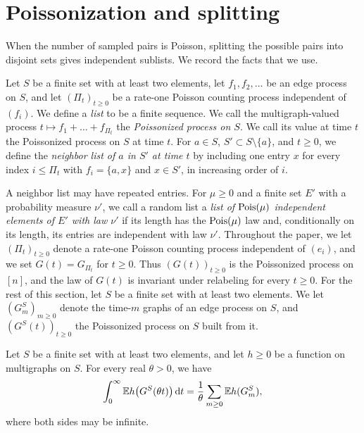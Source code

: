 \section{Poissonization and splitting}\label{sec:pre-poisson}

When the number of sampled pairs is Poisson, splitting the possible pairs into disjoint sets gives independent sublists. We record the facts that we use.

\begin{definition}\label{def:pre-poissonized}
Let $S$ be a finite set with at least two elements, let $f_1, f_2, \dots$ be an edge process on $S$, and let $(\Pi_t)_{t \ge 0}$ be a rate-one Poisson counting process independent of $(f_i)$. We define a \emph{list} to be a finite sequence. We call the multigraph-valued process $t \mapsto f_1 + \dots + f_{\Pi_t}$ the \emph{Poissonized process on $S$}. We call its value at time $t$ the Poissonized process on $S$ at time $t$. For $a \in S$, $S' \subset S \setminus \{a\}$, and $t \ge 0$, we define the \emph{neighbor list of $a$ in $S'$ at time $t$} by including one entry $x$ for every index $i \le \Pi_t$ with $f_i = \{a, x\}$ and $x \in S'$, in increasing order of $i$.
\end{definition}

A neighbor list may have repeated entries. For $\mu \ge 0$ and a finite set $E'$ with a probability measure $\nu'$, we call a random list a \emph{list of $\operatorname{Pois}(\mu)$ independent elements of $E'$ with law $\nu'$} if its length has the $\operatorname{Pois}(\mu)$ law and, conditionally on its length, its entries are independent with law $\nu'$. Throughout the paper, we let $(\Pi_t)_{t \ge 0}$ denote a rate-one Poisson counting process independent of $(e_i)$, and we set $G(t) = G_{\Pi_t}$ for $t \ge 0$. Thus $(G(t))_{t \ge 0}$ is the Poissonized process on $[n]$, and the law of $G(t)$ is invariant under relabeling for every $t \ge 0$. For the rest of this section, let $S$ be a finite set with at least two elements. We let $(G^S_m)_{m \ge 0}$ denote the time-$m$ graphs of an edge process on $S$, and $(G^S(t))_{t \ge 0}$ the Poissonized process on $S$ built from it.

\begin{lemma}\label{lem:pre-poisson}
Let $S$ be a finite set with at least two elements, and let $h \ge 0$ be a function on multigraphs on $S$. For every real $\theta > 0$, we have
\begin{equation}\label{eq:pre-poisson}
\int_0^\infty \mathbb E h\big(G^S(\theta t)\big) \,\mathrm d t = \frac{1}{\theta} \sum_{m \ge 0} \mathbb E h(G^S_m),
\end{equation}
where both sides may be infinite.
\end{lemma}

